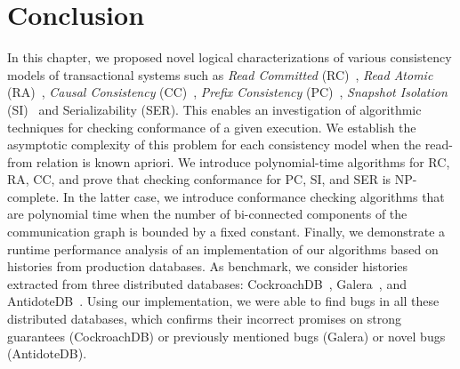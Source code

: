 \section{Conclusion}
\label{sec:txn:conclusion}

In this chapter, we proposed novel logical characterizations of various consistency models of transactional systems such as \emph{Read Committed} (RC)~\cite{DBLP:conf/sigmod/BerensonBGMOO95}, \emph{Read Atomic} (RA)~\cite{DBLP:conf/concur/Cerone0G15},  \emph{Causal Consistency} (CC)~\cite{DBLP:journals/cacm/Lamport78}, \emph{Prefix Consistency} (PC)~\cite{DBLP:conf/ecoop/BurckhardtLPF15}, \emph{Snapshot Isolation} (SI)~\cite{DBLP:conf/sigmod/BerensonBGMOO95} and Serializability (SER). This enables an investigation of algorithmic techniques for checking conformance of a given execution. We establish the asymptotic complexity of this problem for each consistency model when the read-from relation is known apriori. We introduce polynomial-time algorithms for RC, RA, CC, and prove that checking conformance for PC, SI, and SER is NP-complete. In the latter case, we introduce conformance checking algorithms that are polynomial time when the number of bi-connected components of the communication graph is bounded by a fixed constant. Finally, we demonstrate a runtime performance analysis of an implementation of our algorithms based on histories from production databases. As benchmark, we consider histories extracted from three distributed databases: CockroachDB~\cite{cockroach}, Galera~\cite{galera}, and AntidoteDB~\cite{antidote}. Using our implementation, we were able to find bugs in all these distributed databases, which confirms their incorrect promises on strong guarantees (CockroachDB) or previously mentioned bugs (Galera) or novel bugs (AntidoteDB).